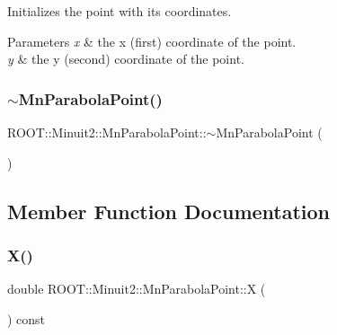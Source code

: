 Initializes the point with its coordinates.


\begin{DoxyParams}{Parameters}
{\em x} & the x (first) coordinate of the point. \\
\hline
{\em y} & the y (second) coordinate of the point. \\
\hline
\end{DoxyParams}
\mbox{\label{classROOT_1_1Minuit2_1_1MnParabolaPoint_ac2acc4c4843b4678005cb2d4610f7555}} 
\subsubsection{\texorpdfstring{$\sim$MnParabolaPoint()}{~MnParabolaPoint()}\hspace{0.1cm}{\footnotesize\ttfamily [2/2]}}
{\footnotesize\ttfamily R\+O\+O\+T\+::\+Minuit2\+::\+Mn\+Parabola\+Point\+::$\sim$\+Mn\+Parabola\+Point (\begin{DoxyParamCaption}{ }\end{DoxyParamCaption})\hspace{0.3cm}{\ttfamily [inline]}}



\subsection{Member Function Documentation}
\mbox{\label{classROOT_1_1Minuit2_1_1MnParabolaPoint_afdb080f9186b5fa6966a42394f2a0678}} 
\subsubsection{\texorpdfstring{X()}{X()}\hspace{0.1cm}{\footnotesize\ttfamily [1/2]}}
{\footnotesize\ttfamily double R\+O\+O\+T\+::\+Minuit2\+::\+Mn\+Parabola\+Point\+::X (\begin{DoxyParamCaption}{ }\end{DoxyParamCaption}) const\hspace{0.3cm}{\ttfamily [inline]}}

